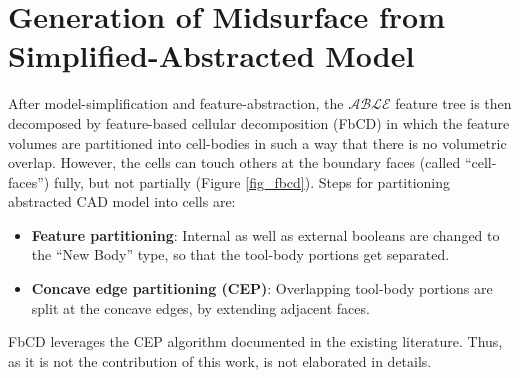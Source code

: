 \section{Generation of Midsurface from Simplified-Abstracted Model}  \label{sec:litsurvey:fbcdmidsurf}
After model-simplification and feature-abstraction, the $\mathcal{ABLE}$ feature tree is then decomposed by feature-based cellular decomposition (FbCD) in which the feature volumes are partitioned into cell-bodies in such a way that there is no volumetric overlap. However, the cells can touch others at the boundary faces (called ``cell-faces'') fully, but not partially (Figure \ref{fig_fbcd}). 
Steps for partitioning abstracted CAD model into cells are:
\begin{itemize}[noitemsep,topsep=2pt,parsep=2pt,partopsep=2pt]
\item \textbf{Feature partitioning}: Internal as well as external booleans  are changed to the ``New Body'' type, so that the tool-body portions get separated.
\item \textbf{Concave edge partitioning (CEP)}: Overlapping tool-body portions are split at the concave edges, by extending adjacent faces.
\end{itemize}

FbCD leverages the CEP algorithm documented in the existing literature. Thus, as it is not the contribution of this work, is not elaborated in details.



